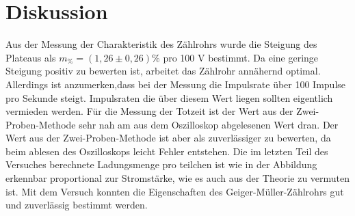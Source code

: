\section{Diskussion}
\label{sec:Diskussion}
Aus der Messung der Charakteristik des Zählrohrs wurde die Steigung des Plateaus als $m_\% = (1,26 \pm 0,26)\%$ pro 100 V bestimmt.
Da eine geringe Steigung positiv zu bewerten ist, arbeitet das Zählrohr annähernd optimal.
Allerdings ist anzumerken,dass bei der Messung die Impulsrate über 100 Impulse pro Sekunde steigt. Impulsraten die über diesem Wert liegen sollten eigentlich vermieden werden.
Für die Messung der Totzeit ist der Wert aus der Zwei-Proben-Methode sehr nah am aus dem Oszilloskop abgelesenen Wert dran.
Der Wert aus der Zwei-Proben-Methode ist aber als zuverlässiger zu bewerten, da beim ablesen des Oszilloskops leicht Fehler entstehen.
Die im letzten Teil des Versuches berechnete Ladungsmenge pro teilchen ist wie in der Abbildung erkennbar proportional zur Stromstärke, wie es auch aus der Theorie zu vermuten ist.
Mit dem Versuch konnten die Eigenschaften des Geiger-Müller-Zählrohrs gut und zuverlässig bestimmt werden.